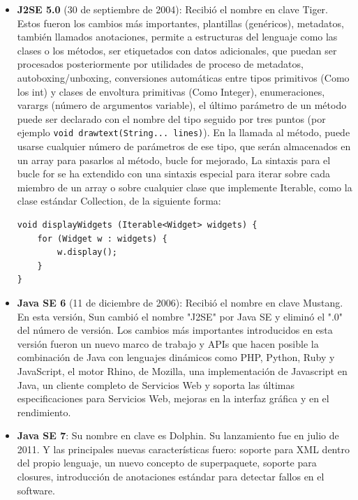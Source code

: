 \begin{itemize}
    \item \textbf{J2SE 5.0} (30 de septiembre de 2004): Recibió el nombre en clave Tiger. Estos fueron los cambios más importantes, plantillas (genéricos), metadatos, también llamados anotaciones, permite a estructuras del lenguaje como las clases o los métodos, ser etiquetados con datos adicionales, que puedan ser procesados posteriormente por utilidades de proceso de metadatos, autoboxing/unboxing, conversiones automáticas entre tipos primitivos (Como los int) y clases de envoltura primitivas (Como Integer), enumeraciones, varargs (número de argumentos variable), el último parámetro de un método puede ser declarado con el nombre del tipo seguido por tres puntos (por ejemplo \lstinline{void drawtext(String... lines)}). En la llamada al método, puede usarse cualquier número de parámetros de ese tipo, que serán almacenados en un array para pasarlos al método, bucle for mejorado, La sintaxis para el bucle for se ha extendido con una sintaxis especial para iterar sobre cada miembro de un array o sobre cualquier clase que implemente Iterable, como la clase estándar Collection, de la siguiente forma:

\begin{lstlisting}[style=Java]
void displayWidgets (Iterable<Widget> widgets) {
	for (Widget w : widgets) {
		w.display();
	}
}
\end{lstlisting}

    \item \textbf{Java SE 6} (11 de diciembre de 2006): Recibió el nombre en clave Mustang. En esta versión, Sun cambió el nombre "J2SE" por Java SE y eliminó el ".0" del número de versión. Los cambios más importantes introducidos en esta versión fueron un nuevo marco de trabajo y APIs que hacen posible la combinación de Java con lenguajes dinámicos como PHP, Python, Ruby y JavaScript, el motor Rhino, de Mozilla, una implementación de Javascript en Java, un cliente completo de Servicios Web y soporta las últimas especificaciones para Servicios Web, mejoras en la interfaz gráfica y en el rendimiento.
    
    \item \textbf{Java SE 7}: Su nombre en clave es Dolphin. Su lanzamiento fue en julio de 2011. Y las principales nuevas características fuero: soporte para XML dentro del propio lenguaje, un nuevo concepto de superpaquete, soporte para closures, introducción de anotaciones estándar para detectar fallos en el software.

\end{itemize}


